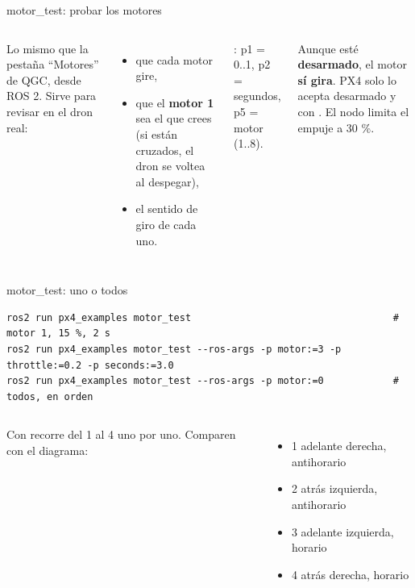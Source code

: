 \begin{frame}{motor\_test: probar los motores}
  \begin{columns}[c]
    \small
    Lo mismo que la pestaña ``Motores'' de QGC, desde ROS 2. Sirve para revisar en el dron real:
    \begin{itemize}
      \item que cada motor gire,
      \item que el \textbf{motor 1} sea el que crees (si están cruzados, el dron se voltea al despegar),
      \item el sentido de giro de cada uno.
    \end{itemize}
    : p1 = 0..1, p2 = segundos, p5 = motor (1..8).
    \begin{ojo}[title={\small\bfseries ¡SIN HÉLICES!}]
      \small Aunque esté \textbf{desarmado}, el motor \textbf{sí gira}. PX4 solo lo acepta desarmado y con
      . El nodo limita el empuje a 30 \%.
    \end{ojo}
  \end{columns}
\end{frame}

\begin{frame}[fragile]{motor\_test: uno o todos}
  \begin{lstlisting}[style=bash]
ros2 run px4_examples motor_test                                   # motor 1, 15 %, 2 s
ros2 run px4_examples motor_test --ros-args -p motor:=3 -p throttle:=0.2 -p seconds:=3.0
ros2 run px4_examples motor_test --ros-args -p motor:=0            # todos, en orden
  \end{lstlisting}
  \begin{columns}[c]
    \small
    Con  recorre del 1 al 4 uno por uno. Comparen con el diagrama:
    \begin{itemize}
      \item 1 adelante derecha, antihorario
      \item 2 atrás izquierda, antihorario
      \item 3 adelante izquierda, horario
      \item 4 atrás derecha, horario
    \end{itemize}
    \centering
  \end{columns}
\end{frame}

